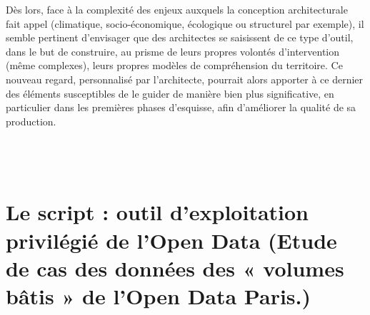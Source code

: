 \documentclass[
  11pt,
  french,
]{article}
\begin{document}
Dès lors, face à la complexité des enjeux auxquels la conception
architecturale fait appel (climatique, socio-économique, écologique ou
structurel par exemple), il semble pertinent d'envisager que des
architectes se saisissent de ce type d'outil, dans le but de construire,
au prisme de leurs propres volontés d'intervention (même complexes),
leurs propres modèles de compréhension du territoire. Ce nouveau regard,
personnalisé par l'architecte, pourrait alors apporter à ce dernier des
éléments susceptibles de le guider de manière bien plus significative,
en particulier dans les premières phases d'esquisse, afin d'améliorer la
qualité de sa production.\\
~\\
~\\
\normalfont\bfseries\color{red}{Ainsi, dans quelle mesure l’exploitation de données issues de l’Open Data grâce au langage Python représente-t-elle un avantage certain pour l’architecte ?}\
\
\
\
\normalfont\color{black}{Après avoir initialement démontré l’intérêt du langage Python dans l’extraction et la manipulation des données issues des plateformes accessibles en Open Data à travers l’élaboration complète d’un script de récolte de données, ce dernier sera complété à travers un aperçu constitué d’exemples clés de la capacité de Python à produire des documents de travail utiles à l’architecte (cartographie, dessin et modélisation). Enfin, ce travail d’exploitation sera abouti en montrant la prodigieuse capacité du langage Python à permettre de manière accessible l’analyse complexe de ces données ainsi que la mise en place d’algorithmes de prédiction.}

\newpage

\hypertarget{le-script-outil-dexploitation-priviluxe9giuxe9-de-lopen-data-etude-de-cas-des-donnuxe9es-des-volumes-buxe2tis-de-lopen-data-paris.}{%
\section{Le script : outil d'exploitation privilégié de l'Open Data
(Etude de cas des données des « volumes bâtis » de l'Open Data
Paris.)}\label{le-script-outil-dexploitation-priviluxe9giuxe9-de-lopen-data-etude-de-cas-des-donnuxe9es-des-volumes-buxe2tis-de-lopen-data-paris.}}
\end{document}
